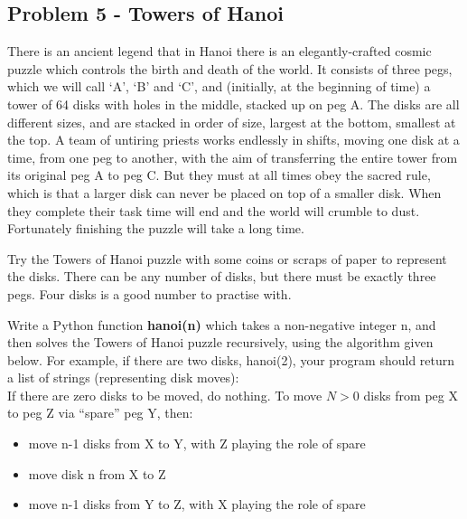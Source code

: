 \documentclass[11pt,a4paper]{report}
\begin{document}
\subsection*{Problem 5  - Towers of Hanoi}

There is an ancient legend that in Hanoi there is an elegantly-crafted cosmic puzzle
which controls the birth and death of the world. It consists of three pegs, which we
will call ‘A’, ‘B’ and ‘C’, and (initially, at the beginning of time) a tower of 64 disks
with holes in the middle, stacked up on peg A. The disks are all different sizes, and are
stacked in order of size, largest at the bottom, smallest at the top. A team of untiring
priests works endlessly in shifts, moving one disk at a time, from one peg to another,
with the aim of transferring the entire tower from its original peg A to peg C. But
they must at all times obey the sacred rule, which is that a larger disk can never be
placed on top of a smaller disk. When they complete their task time will end and the
world will crumble to dust. Fortunately finishing the puzzle will take a long time.

Try the Towers of Hanoi puzzle with some coins or scraps of paper to represent the
disks. There can be any number of disks, but there must be exactly three pegs. Four
disks is a good number to practise with.

Write a Python function \textbf{hanoi(n)} which takes a non-negative
integer n, and then solves the Towers of Hanoi puzzle recursively, using the algorithm
given below. For example, if there are two disks, hanoi(2), your program should return a list of strings (representing disk moves):
\\

If there are zero disks to be moved, do nothing. To move $N > 0$ disks from peg X
to peg Z via “spare” peg Y, then:
\begin{itemize}
 \item move n-1 disks from X to Y, with Z playing the role of spare
 \item move disk n from X to Z
 \item move n-1 disks from Y to Z, with X playing the role of spare
\end{itemize}
\end{document}
